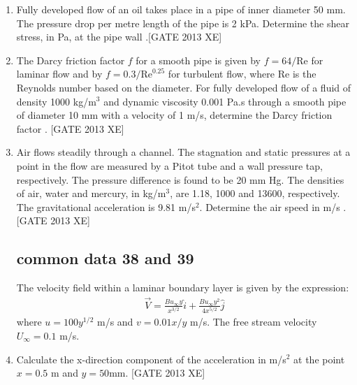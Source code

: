 \documentclass[journal,12pt,onecolumn]{IEEEtran}
\theoremstyle{remark}
\begin{document}
\begin{enumerate}
\begin{multicols}{4}
\begin{enumerate}
\item $x^2 + y^2$
\item $2xy$
\item $x^2 - y^2$
\item $x - y$
\end{enumerate}
\end{multicols}

\item Fully developed flow of an oil takes place in a pipe of inner diameter 50 mm. The pressure drop per metre length of the pipe is 2 kPa. Determine the shear stress, in Pa, at the pipe wall  \underline{\hspace{1.5cm}}.\hfill[GATE 2013 XE]

\item The Darcy friction factor $f$ for a smooth pipe is given by $f=64/\text{Re}$ for laminar flow and by $f=0.3/\text{Re}^{0.25}$ for turbulent flow, where Re is the Reynolds number based on the diameter. For fully developed flow of a fluid of density 1000 kg/m$^3$ and dynamic viscosity 0.001 Pa.s through a smooth pipe of diameter 10 mm with a velocity of 1 m/s, determine the Darcy friction factor \underline{\hspace{1.5cm}}. \hfill[GATE 2013 XE]



\item Air flows steadily through a channel. The stagnation and static pressures at a point in the flow are measured by a Pitot tube and a wall pressure tap, respectively. The pressure difference is found to be 20 mm Hg. The densities of air, water and mercury, in kg/m$^3$, are 1.18, 1000 and 13600, respectively. The gravitational acceleration is 9.81 m/s$^2$. Determine the air speed in m/s \underline{\hspace{1.5cm}}. \hfill[GATE 2013 XE]

\subsection{common data 38 and 39} 
The velocity field within a laminar boundary layer is given by the expression:
 \begin{align}
\vec{V} = \frac{Bu_{\infty}y}{x^{3/2}}\hat{i} + \frac{Bu_{\infty}y^2}{4x^{5/2}}\hat{j}
\end{align}
where $u = 100 y^{1/2}$ m/s and $v = 0.01 x / y$ m/s. The free stream velocity $U_{\infty} = 0.1$ m/s.
\item Calculate the x-direction component of the acceleration in m/s$^2$ at the point $x=0.5$ m and $y=50$mm\underline{\hspace{1.5cm}}. \hfill[GATE 2013 XE]


\end{enumerate}
\end{document}
